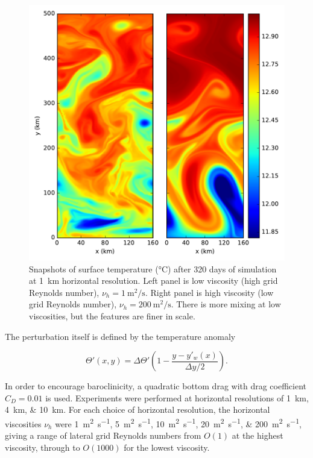 \begin{figure}
  \includegraphics{../plots/eddies_snapshot_dx1.pdf}
  \caption{\label{fig:eddies-snapshot} Snapshots of surface temperature (\si{\celsius}) after 320 days of simulation at \SI{1}{\kilo\metre} horizontal resolution. Left panel is low viscosity (high grid Reynolds number), $\nu_h = \SI{1}{\square\metre\per\second}$. Right panel is high viscosity (low grid Reynolds number), $\nu_h = \SI{200}{\square\metre\per\second}$. There is more mixing at low viscosities, but the features are finer in scale.}
\end{figure}

The perturbation itself is defined by the temperature anomaly

\begin{equation}
  \Theta'(x,y) = \Delta\Theta'\left(1 - \frac{y - y'_w(x)}{\Delta y / 2}\right).
\end{equation}

In order to encourage baroclinicity, a quadratic bottom drag with drag coefficient $C_D = 0.01$ is used. Experiments were performed at horizontal resolutions of \SIlist{1;4;10}{\kilo\metre}. For each choice of horizontal resolution, the horizontal viscosities $\nu_h$ were \SIlist{1;5;10;20;200}{\square\metre\per\second}, giving a range of lateral grid Reynolds numbers from $O(1)$ at the highest viscosity, through to $O(1000)$ for the lowest viscosity.

